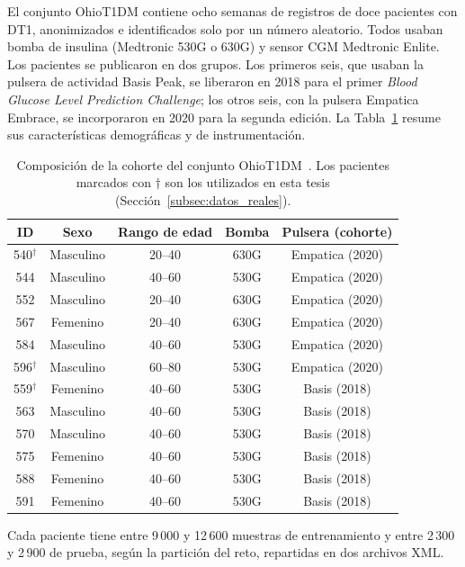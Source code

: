 \documentclass{report}
\begin{document}
El conjunto OhioT1DM contiene ocho semanas de registros de doce pacientes con DT1, anonimizados e identificados solo por un número aleatorio. Todos usaban bomba de insulina (Medtronic 530G o 630G) y sensor CGM Medtronic Enlite. Los pacientes se publicaron en dos grupos. Los primeros seis, que usaban la pulsera de actividad Basis Peak, se liberaron en 2018 para el primer \textit{Blood Glucose Level Prediction Challenge}; los otros seis, con la pulsera Empatica Embrace, se incorporaron en 2020 para la segunda edición. La Tabla~\ref{tab:ohio_cohort} resume sus características demográficas y de instrumentación.

\begin{table}[H]
    \centering
    \caption{Composición de la cohorte del conjunto OhioT1DM~\cite{marling2020ohiot1dm}. Los pacientes marcados con $\dagger$ son los utilizados en esta tesis (Sección~\ref{subsec:datos_reales}).}
    \label{tab:ohio_cohort}
    \begin{tabular}{ccccc}
        \toprule
        \textbf{ID} & \textbf{Sexo} & \textbf{Rango de edad} & \textbf{Bomba} & \textbf{Pulsera (cohorte)} \\
        \midrule
        540$^\dagger$ & Masculino & 20--40 & 630G & Empatica (2020) \\
        544 & Masculino & 40--60 & 530G & Empatica (2020) \\
        552 & Masculino & 20--40 & 630G & Empatica (2020) \\
        567 & Femenino  & 20--40 & 630G & Empatica (2020) \\
        584 & Masculino & 40--60 & 530G & Empatica (2020) \\
        596$^\dagger$ & Masculino & 60--80 & 530G & Empatica (2020) \\
        559$^\dagger$ & Femenino  & 40--60 & 530G & Basis (2018) \\
        563 & Masculino & 40--60 & 530G & Basis (2018) \\
        570 & Masculino & 40--60 & 530G & Basis (2018) \\
        575 & Femenino  & 40--60 & 530G & Basis (2018) \\
        588 & Femenino  & 40--60 & 530G & Basis (2018) \\
        591 & Femenino  & 40--60 & 530G & Basis (2018) \\
        \bottomrule
    \end{tabular}
\end{table}

Cada paciente tiene entre 9\,000 y 12\,600 muestras de entrenamiento y entre 2\,300 y 2\,900 de prueba, según la partición del reto, repartidas en dos archivos XML.
\end{document}
